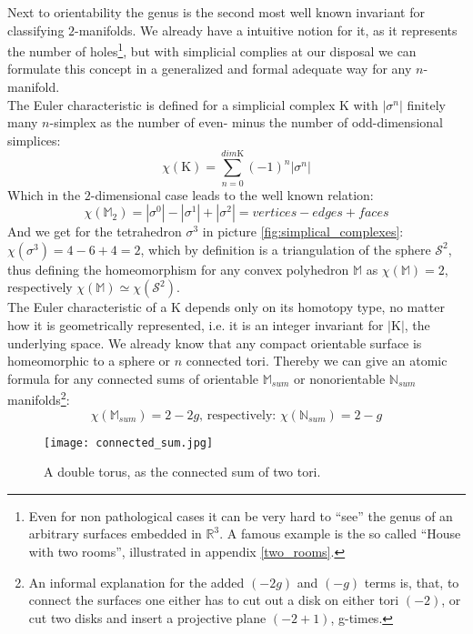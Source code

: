 Next to orientability the genus is the second most well known invariant for classifying $2$-manifolds.
We already have a intuitive notion for it, as it represents the number of holes\footnote{ Even for non pathological cases it can be very hard to ``see'' the genus of an arbitrary surfaces embedded in $\mathbb{R}^{3}$. A famous example is the so called ``House with two rooms'', illustrated in appendix \ref{two_rooms}.}, but with simplicial complies at our disposal we can formulate this concept in a generalized and formal adequate way for any $n$-manifold.\\
The Euler characteristic is defined for a simplicial complex $\mathrm{K}$ with $|\sigma^{n}|$ finitely many $n$-simplex as the number of even- minus the number of odd-dimensional simplices:
\begin{equation} \label{eq:euler_characteristic}
\chi(\mathrm{K}) = \sum_{n = 0}^{dim \mathrm{K}} (-1)^{n} |\sigma^{n}|
\end{equation}
Which in the $2$-dimensional case leads to the well known relation:
\begin{equation*}
\chi(\mathbb{M}_{2}) = |\sigma^{0}| - |\sigma^{1}| + |\sigma^{2}| = vertices - edges + faces
\end{equation*}
And we get for the tetrahedron $\sigma^{3}$ in picture \ref{fig:simplical_complexes}: $\chi(\sigma^{3}) = 4 - 6 + 4 = 2$, which by definition is a triangulation of the sphere $\mathcal{S}^{2}$, thus defining the homeomorphism for any convex polyhedron $\mathbb{M}$ as $\chi(\mathbb{M}) = 2$, respectively $\chi(\mathbb{M}) \simeq \chi(\mathcal{S}^{2})$.\\
The Euler characteristic of a $\mathrm{K}$ depends only on its homotopy type, no matter how it is geometrically represented, i.e.
it is an integer invariant for $|\mathrm{K}|$, the underlying space.
We already know that any compact orientable surface is homeomorphic to a sphere or $n$ connected tori.
Thereby we can give an atomic formula for any connected sums of orientable $\mathbb{M}_{sum}$ or nonorientable $\mathbb{N}_{sum}$ manifolds\footnote{ An informal explanation for the added $(-2g)$ and $(-g)$ terms is, that, to connect the surfaces one either has to cut out a disk on either tori $(-2)$, or cut two disks and insert a projective plane $(-2+1)$, g-times.}: 
\begin{equation}
\chi(\mathbb{M}_{sum}) = 2 - 2g \text{, respectively: } \chi(\mathbb{N}_{sum}) = 2 - g
\end{equation}
\vspace*{-4ex}
\begin{figure}[ht]
\centering
\texttt{[image: connected\_sum.jpg]}
\caption{A double torus, as the connected sum of two tori.}
\label{fig:connected_sum}
\end{figure}

